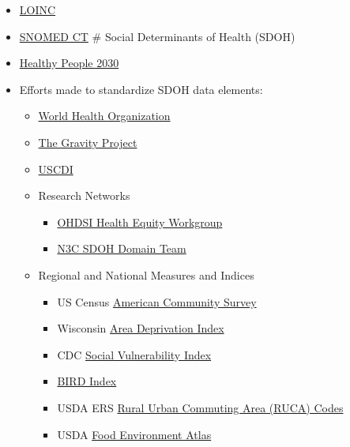 \documentclass[
]{journal}
\providecommand{\tightlist}{%
  \setlength{\itemsep}{0pt}\setlength{\parskip}{0pt}}
\begin{document}
\begin{itemize}
\item
  \href{https://loinc.org/}{LOINC}
\item
  \href{https://www.snomed.org/}{SNOMED CT}
  \# Social Determinants of Health (SDOH)
\item
  \href{https://health.gov/healthypeople/objectives-and-data/social-determinants-health}{Healthy People 2030}
\item
  Efforts made to standardize SDOH data elements:

  \begin{itemize}
  \tightlist
  \item
    \href{https://www.who.int/health-topics/social-determinants-of-health\#tab=tab_1}{World Health Organization}
  \item
    \href{https://thegravityproject.net/}{The Gravity Project}
  \item
    \href{https://www.healthit.gov/isa/uscdi-data-class/social-determinants-health}{USCDI}
  \item
    Research Networks

    \begin{itemize}
    \tightlist
    \item
      \href{https://github.com/OHDSI/HealthEquityWG}{OHDSI Health Equity Workgroup}
    \item
      \href{https://covid.cd2h.org/social-determinants}{N3C SDOH Domain Team}
    \end{itemize}
  \item
    Regional and National Measures and Indices

    \begin{itemize}
    \tightlist
    \item
      US Census \href{https://www.census.gov/programs-surveys/acs}{American Community Survey}
    \item
      Wisconsin \href{https://www.neighborhoodatlas.medicine.wisc.edu/}{Area Deprivation Index}
    \item
      CDC \href{https://www.atsdr.cdc.gov/placeandhealth/svi/index.html}{Social Vulnerability Index}
    \item
      \href{https://www.ncbi.nlm.nih.gov/pmc/articles/PMC3432399/}{BIRD Index}
    \item
      USDA ERS \href{https://www.ers.usda.gov/data-products/rural-urban-commuting-area-codes/documentation/}{Rural Urban Commuting Area (RUCA) Codes}
    \item
      USDA \href{https://www.ers.usda.gov/data-products/food-environment-atlas/}{Food Environment Atlas}
    \end{itemize}
  \end{itemize}
\end{itemize}
\end{document}
